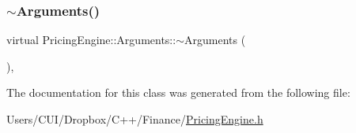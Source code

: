 \hypertarget{class_pricing_engine_1_1_arguments_a383465da5f7d0188a540264692ac2eff}{}\label{class_pricing_engine_1_1_arguments_a383465da5f7d0188a540264692ac2eff} 
\subsubsection{\texorpdfstring{$\sim$\+Arguments()}{~Arguments()}}
{\footnotesize\ttfamily virtual Pricing\+Engine\+::\+Arguments\+::$\sim$\+Arguments (\begin{DoxyParamCaption}{ }\end{DoxyParamCaption})\hspace{0.3cm}{\ttfamily [inline]}, {\ttfamily [virtual]}}



The documentation for this class was generated from the following file\+:\begin{DoxyCompactItemize}
\item 
Users/\+C\+U\+I/\+Dropbox/\+C++/\+Finance/\hyperlink{_pricing_engine_8h}{Pricing\+Engine.\+h}\end{DoxyCompactItemize}

